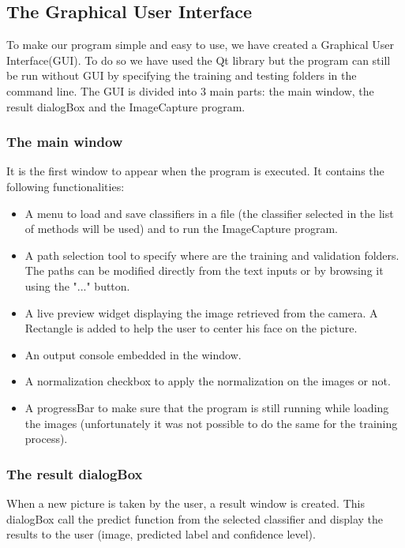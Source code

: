\subsection{The Graphical User Interface}

To make our program simple and easy to use, we have created a Graphical User Interface(GUI). To do so we have used the Qt library but the program can 
still be run without GUI by specifying the training and testing folders in the command line.
The GUI is divided into 3 main parts: the main window, the result dialogBox and the ImageCapture program.

\subsubsection{The main window}

It is the first window to appear when the program is executed. It contains the following functionalities:
\begin{itemize}
 \item A menu to load and save classifiers in a file (the classifier selected in the list of methods will be used) and to run the ImageCapture 
program.

\item A path selection tool to specify where are the training and validation folders. The paths can be modified directly from the text inputs or 
by browsing it using the "..." button.

\item A live preview widget displaying the image retrieved from the camera. A Rectangle is added to help the user to center his face on the 
picture.
\item An output console embedded in the window.
\item A normalization checkbox to apply the normalization on the images or not.
\item A progressBar to make sure that the program is still running while loading the images (unfortunately it was not possible to do the same for the 
training process).
\end{itemize}

\subsubsection{The result dialogBox}
When a new picture is taken by the user, a result window is created. This dialogBox call the predict function from the selected classifier and 
display the results to the user (image, predicted label and confidence level).

